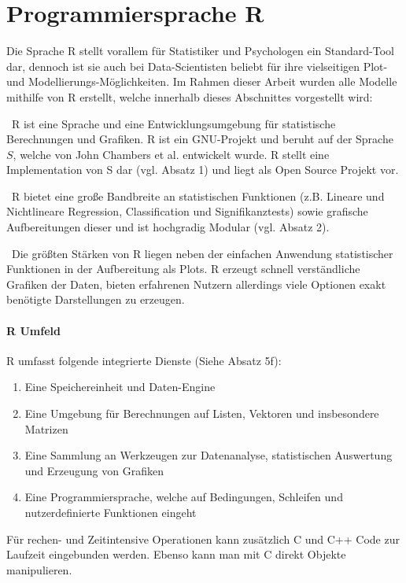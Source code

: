 \section{Programmiersprache R}
\label{sec:R}
Die Sprache R stellt vorallem für Statistiker und Psychologen ein Standard-Tool dar, dennoch ist sie auch bei Data-Scientisten beliebt für ihre vielseitigen Plot- und Modellierungs-Möglichkeiten. Im Rahmen dieser Arbeit wurden alle Modelle mithilfe von R erstellt, welche innerhalb dieses Abschnittes vorgestellt wird:

~\newline R ist eine Sprache und eine Entwicklungsumgebung für statistische Berechnungen und Grafiken. R ist ein GNU-Projekt und beruht auf der Sprache $S$, welche von John Chambers et al. entwickelt wurde. R stellt eine Implementation von S dar (vgl. \cite{RProject} Absatz 1) und liegt als Open Source Projekt vor.

~\newline R bietet eine große Bandbreite an statistischen Funktionen (z.B. Lineare und Nichtlineare Regression, Classification und Signifikanztests) sowie grafische Aufbereitungen dieser und ist hochgradig Modular (vgl. \cite{RProject} Absatz 2). 

~\newline Die größten Stärken von R liegen neben der einfachen Anwendung statistischer Funktionen in der Aufbereitung als Plots. R erzeugt schnell verständliche Grafiken der Daten, bieten erfahrenen Nutzern allerdings viele Optionen exakt benötigte Darstellungen zu erzeugen. 

\paragraph{ R Umfeld} 
R umfasst folgende integrierte Dienste (Siehe \cite{RProject} Absatz 5f):
\begin{enumerate}
	\item Eine Speichereinheit und Daten-Engine
	\item Eine Umgebung für Berechnungen auf Listen, Vektoren und insbesondere Matrizen
	\item Eine Sammlung an Werkzeugen zur Datenanalyse, statistischen Auswertung und Erzeugung von Grafiken
	\item Eine Programmiersprache, welche auf Bedingungen, Schleifen und nutzerdefinierte Funktionen eingeht
\end{enumerate}

Für rechen- und Zeitintensive Operationen kann zusätzlich C und C++ Code zur Laufzeit eingebunden werden. Ebenso kann man mit C direkt Objekte manipulieren. 

